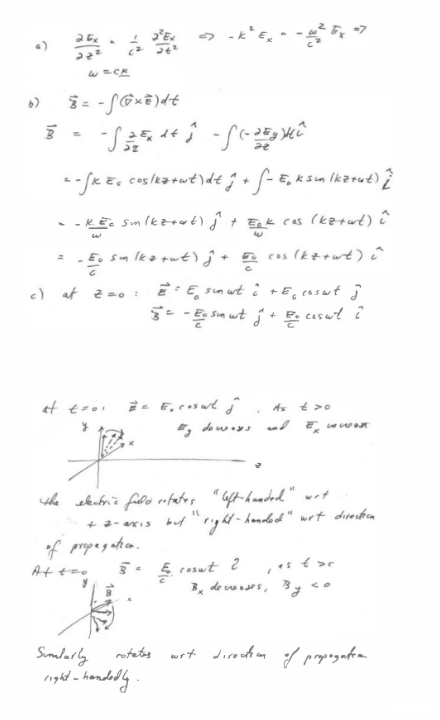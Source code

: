 \documentclass[makesolutionspdf]{esg8022pset}
\begin{document}
\begin{solution}
\begin{figure}[H]
    \centering
    \includegraphics[width = 15cm]{waves2sola}
  \end{figure}
  \begin{figure}[H]
    \centering
    \includegraphics[width = 15cm]{waves2solb}
  \end{figure}
\end{solution}
\end{document}
